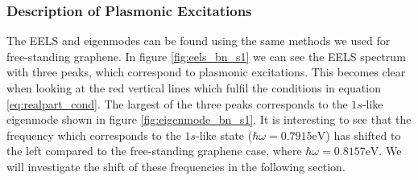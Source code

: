 
\subsubsection{Description of Plasmonic Excitations}

The EELS and eigenmodes can be found using the same methods we used for free-standing graphene. In figure \ref{fig:eels_bn_s1} we can see the EELS spectrum with three peaks, which correspond to plasmonic excitations. This becomes clear when looking at the red vertical lines which fulfil the conditions in equation \ref{eq:realpart_cond}. The largest of the three peaks corresponds to the $1s$-like eigenmode shown in figure \ref{fig:eigenmode_bn_s1}. It is interesting to see that the frequency which corresponds to the $1s$-like state ($\hbar\omega = 0.7915\mathrm{eV}$) has shifted to the left compared to the free-standing graphene case, where $\hbar\omega = 0.8157\mathrm{eV}$. We will investigate the shift of these frequencies in the following section.

